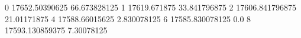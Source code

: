 0 17652.50390625 66.673828125
1 17619.671875 33.841796875
2 17606.841796875 21.01171875
4 17588.66015625 2.830078125
6 17585.830078125 0.0
8 17593.130859375 7.30078125
